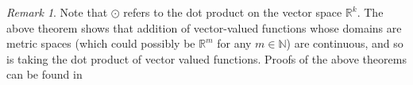 \documentclass[12pt]{article}
\theoremstyle{definition}
\numberwithin{theorem}{subsection}
\numberwithin{corollary}{subsection}
\theoremstyle{remark}
\newtheorem*{remark}{Remark}
\theoremstyle{point}
\begin{document}
		\medskip
		
		\begin{remark}
			Note that $\odot$ refers to the dot product on the vector space $\mathbb{R}^k$. The above theorem shows that addition of vector-valued functions whose domains are metric spaces (which could possibly be $\mathbb{R}^m$ for any $m \in \mathbb{N}$)  are continuous, and so is taking the dot product of vector valued functions. Proofs of the above theorems can be found in \cite{rudin1964principles}
		\end{remark}
	
	
	{}
	
	

    
\end{document}
